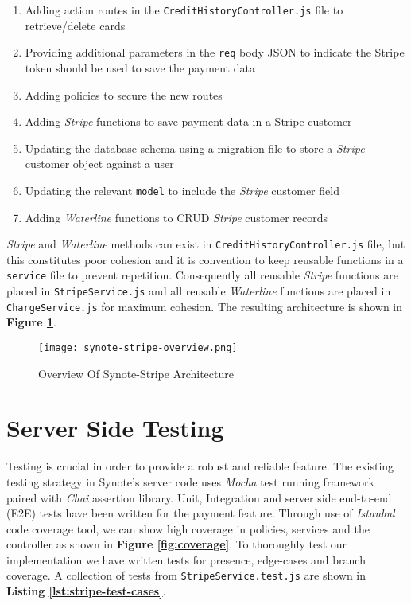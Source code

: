 \begin{enumerate}
	\item Adding action routes in the \texttt{CreditHistoryController.js} file to retrieve/delete cards
    \item Providing additional parameters in the \texttt{req} body JSON to indicate the Stripe token should be used to save the payment data
    \item Adding policies to secure the new routes
    \item Adding \textit{Stripe} functions to save payment data in a Stripe customer
    \item Updating the database schema using a migration file to store a \textit{Stripe} customer object against a user
    \item Updating the relevant \texttt{model} to include the \textit{Stripe} customer field
    \item Adding \textit{Waterline} functions to CRUD \textit{Stripe} customer records
\end{enumerate}

\textit{Stripe} and \textit{Waterline} methods can exist in \texttt{CreditHistoryController.js} file, but this constitutes poor cohesion and it is convention to keep reusable functions in a \texttt{service} file to prevent repetition. Consequently all reusable \textit{Stripe} functions are placed in \texttt{StripeService.js} and all reusable \textit{Waterline} functions are placed in \texttt{ChargeService.js} for maximum cohesion. The resulting  architecture is shown in \textbf{Figure \ref{fig:synote-stripe}}.\\

\begin{figure}[!hbt]
  \centering
 	\texttt{[image: synote-stripe-overview.png]}
  \caption{Overview Of Synote-Stripe Architecture}
 	\label{fig:synote-stripe}
\end{figure}

\section{Server Side Testing}
\label{sec:server-side-testing}

Testing is crucial in order to provide a robust and reliable feature. The existing testing strategy in Synote's server code uses \textit{Mocha} \cite{mocha} test running framework paired with \textit{Chai} \cite{chai} assertion library. Unit, Integration and server side end-to-end (E2E) tests have been written for the payment feature. Through use of \textit{Istanbul} \cite{istanbul} code coverage tool, we can show high coverage in policies, services and the controller as shown in \textbf{Figure \ref{fig:coverage}}. To thoroughly test our implementation we have written tests for presence, edge-cases and branch coverage. A collection of tests from \texttt{StripeService.test.js} are shown in \textbf{Listing \ref{lst:stripe-test-cases}}.\\

